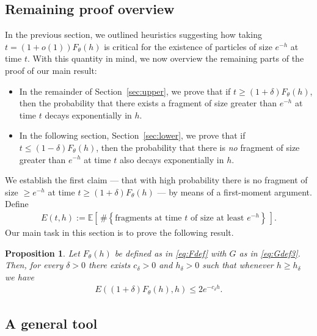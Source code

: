\documentclass[a4,12pt]{amsart}
\numberwithin{equation}{section}
\newtheorem{proposition}[thm]{Proposition}
\begin{document}
\subsection{Remaining proof overview}

    In the previous section, we outlined heuristics suggesting how taking $t = (1+o(1))F_\theta(h)$ is critical for the existence of particles of size $e^{-h}$ at time $t$. With this quantity in mind, we now overview the remaining parts of the proof of our main result:
	\begin{itemize}
    		\item In the remainder of Section~\ref{sec:upper}, 
			we prove that if $t \geq (1+\delta)F_\theta(h)$,  
    			then the probability that there exists a fragment of size greater than $e^{-h}$ 
			at time $t$ decays exponentially in $h$.  
    		\item In the following section, Section~\ref{sec:lower}, 
			we prove that if $t \leq (1-\delta)F_\theta(h)$,  
    			then the probability that there is \emph{no} fragment of size greater than 
			$e^{-h}$ at time $t$ also decays exponentially in $h$.  
	\end{itemize}

	We establish the first claim — that with high probability there is no fragment of size $\geq e^{-h}$  
	at time $t \geq (1+\delta)F_\theta(h)$ — by means of a first-moment argument.  
	Define
	\begin{align*}
    		E(t,h) := \mathbb{E}\!\left[\, \#\left\{\text{fragments at time $t$ of size at least $e^{-h}$}\right\} \,\right].
	\end{align*}
	Our main task in this section is to prove the following result.




	\begin{proposition} \label{prop:infiniteupper}
		Let $ F_\theta(h)$ be defined as in \eqref{eq:Fdef} with $G$ as in \eqref{eq:Gdef3}. Then, for every $\delta > 0$ there exists 
		$c_\delta > 0$ and $h_\delta > 0$ such that whenever $h \geq h_\delta$ we have
		\begin{align*}
			E((1+\delta)F_\theta(h),h) \leq 2e^{ - c_\delta h}.
		\end{align*}
	\end{proposition}

\subsection{A general tool}
\end{document}
